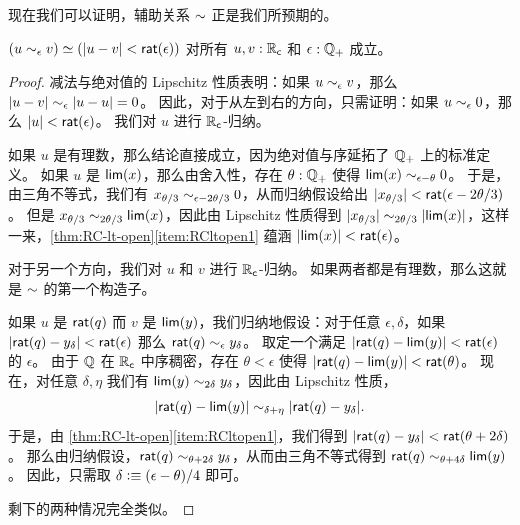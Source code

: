 现在我们可以证明，辅助关系 $\mathord\sim$ 正是我们所预期的。

\begin{thm} \label{RC-sim-eqv-le}
  $(u \sim_{\epsilon} v) \simeq (|u - v| < \mathsf{rat}(\epsilon))$
  对所有 $u, v : \mathbb{R}_\mathsf{c}$ 和 $\epsilon : \mathbb{Q}_{+}$ 成立。
\end{thm}

\begin{proof}
  减法与绝对值的 Lipschitz 性质表明：如果 $u\sim_{\epsilon} v$，那么 $|u-v| \sim_{\epsilon} |u-u| = 0$。
  因此，对于从左到右的方向，只需证明：如果 $u\sim_{\epsilon} 0$，那么 $|u|<\mathsf{rat}(\epsilon)$。
  我们对 $u$ 进行 $\mathbb{R}_\mathsf{c}$-归纳。

  如果 $u$ 是有理数，那么结论直接成立，因为绝对值与序延拓了 $\mathbb{Q}_{+}$ 上的标准定义。
  如果 $u$ 是 $\mathsf{lim}(x)$，那么由舍入性，存在 $\theta:\mathbb{Q}_{+}$ 使得 $\mathsf{lim}(x)\sim_{\epsilon-\theta} 0$。
  于是，由三角不等式，我们有 $x_{\theta/3} \sim_{\epsilon-2\theta/3} 0$，从而归纳假设给出 $|x_{\theta/3}|<\mathsf{rat}(\epsilon-2\theta/3)$。
  但是 $x_{\theta/3} \sim_{2\theta/3} \mathsf{lim}(x)$，因此由 Lipschitz 性质得到 $|x_{\theta/3}| \sim_{2\theta/3} |\mathsf{lim}(x)|$，这样一来，\cref{thm:RC-lt-open}\ref{item:RCltopen1} 蕴涵 $|\mathsf{lim}(x)|<\mathsf{rat}(\epsilon)$。

  对于另一个方向，我们对 $u$ 和 $v$ 进行 $\mathbb{R}_\mathsf{c}$-归纳。
  如果两者都是有理数，那么这就是 $\mathord\sim$ 的第一个构造子。

  如果 $u$ 是 $\mathsf{rat}(q)$ 而 $v$ 是 $\mathsf{lim}(y)$，我们归纳地假设：对于任意 $\epsilon,\delta$，如果 $|\mathsf{rat}(q)-y_\delta|<\mathsf{rat}(\epsilon)$ 那么 $\mathsf{rat}(q) \sim_{\epsilon} y_\delta$。
  取定一个满足 $|\mathsf{rat}(q) - \mathsf{lim}(y)|<\mathsf{rat}(\epsilon)$ 的 $\epsilon$。
  由于 $\mathbb{Q}$ 在 $\mathbb{R}_\mathsf{c}$ 中序稠密，存在 $\theta<\epsilon$ 使得 $|\mathsf{rat}(q) - \mathsf{lim}(y)|<\mathsf{rat}(\theta)$。
  现在，对任意 $\delta,\eta$ 我们有 $\mathsf{lim}(y)\sim_{2\delta} y_\delta$，因此由 Lipschitz 性质，
  \[ |\mathsf{rat}(q) - \mathsf{lim}(y)| \sim_{\delta+\eta} |\mathsf{rat}(q) - y_\delta|. \]
  于是，由 \cref{thm:RC-lt-open}\ref{item:RCltopen1}，我们得到 $|\mathsf{rat}(q) - y_\delta| < \mathsf{rat}(\theta+2\delta)$。
  那么由归纳假设，$\mathsf{rat}(q) \sim_{\theta+2\delta} y_\delta$，从而由三角不等式得到 $\mathsf{rat}(q)\sim_{\theta+4\delta} \mathsf{lim}(y)$。
  因此，只需取 $\delta \vcentcolon\equiv (\epsilon-\theta)/4$ 即可。

  剩下的两种情况完全类似。
\end{proof}

